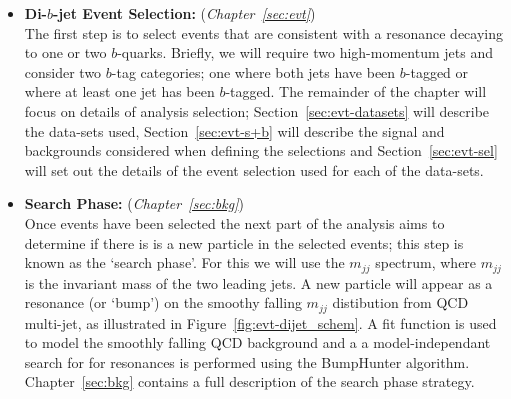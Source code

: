 \begin{itemize}[leftmargin=*]
\item\textbf{Di-$b$-jet Event Selection:} (\textit{Chapter~\ref{sec:evt}})\\
  The first step is to select events that are consistent with a resonance decaying to one or two $b$-quarks.
  Briefly, we will require two high-momentum jets and consider two $b$-tag categories;
  one where both jets have been $b$-tagged or where at least one jet has been $b$-tagged.
  The remainder of the chapter will focus on details of analysis selection;
  Section~\ref{sec:evt-datasets} will describe the data-sets used,
  Section~\ref{sec:evt-s+b} will describe the signal and backgrounds
  considered when defining the selections
  and Section~\ref{sec:evt-sel} will set out
  the details of the event selection used for each of the data-sets.
  \\
\item\textbf{Search Phase:} (\textit{Chapter~\ref{sec:bkg}})\\
  Once events have been selected the next part of the analysis aims to determine if there is
  is a new particle in the selected events; this step is known as the `search phase'.
  For this we will use the $m_{jj}$ spectrum, where $m_{jj}$ is the invariant mass of the two leading jets.
  A new particle will appear as a resonance (or `bump') on the smoothy falling
  $m_{jj}$ distibution from QCD multi-jet, as illustrated in Figure~\ref{fig:evt-dijet_schem}.
  A fit function is used to model the smoothly falling QCD background and a
  a model-independant search for for resonances is performed using the BumpHunter algorithm.
  Chapter~\ref{sec:bkg} contains a full description of the search phase strategy.
  \\
  

\end{itemize}
